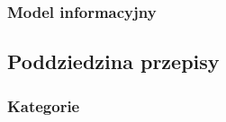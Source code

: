 \subsubsection{Model informacyjny}\label{subsubsec:database:products:domainModel}


\subsection{Poddziedzina przepisy}\label{subsec:database:recipes}

\subsubsection{Kategorie}\label{subsubsec:database:recipes:categories}
